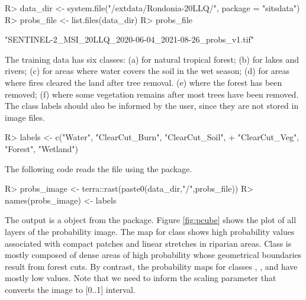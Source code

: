 \documentclass[
  shortnames]{jss}
\begin{document}
\begin{CodeChunk}
\begin{CodeInput}
R> data_dir <- system.file("/extdata/Rondonia-20LLQ/", package = "sitsdata")
R> probs_file <- list.files(data_dir)
R> probs_file
\end{CodeInput}
\begin{CodeOutput}
[1] "SENTINEL-2_MSI_20LLQ_2020-06-04_2021-08-26_probs_v1.tif"
\end{CodeOutput}
\end{CodeChunk}

The training data has six classes: (a)  for natural tropical forest; (b)  for lakes and rivers; (c)  for areas where water covers the soil in the wet season; (d)  for areas where fires cleared the land after tree removal. (e)  where the forest has been removed; (f)  where some vegetation remains after most trees have been removed. The class labels should also be informed by the user, since they are not stored in image files.

\begin{CodeChunk}
\begin{CodeInput}
R> labels <- c("Water", "ClearCut_Burn", "ClearCut_Soil",
+             "ClearCut_Veg", "Forest", "Wetland")
\end{CodeInput}
\end{CodeChunk}

The following code reads the file using the  package.

\begin{CodeChunk}
\begin{CodeInput}
R> probs_image <- terra::rast(paste0(data_dir,"/",probs_file))
R> names(probs_image) <- labels
\end{CodeInput}
\end{CodeChunk}

The output is a  object from the  package. Figure \ref{fig:pcube} shows the plot of all layers of the probability image. The map for class  shows high probability values associated with compact patches and linear stretches in riparian areas. Class  is mostly composed of dense areas of high probability whose geometrical boundaries result from forest cuts. By contrast, the probability maps for classes , , and  have mostly low values. Note that we need to inform the scaling parameter that converts the image to {[}0..1{]} interval.
\end{document}
